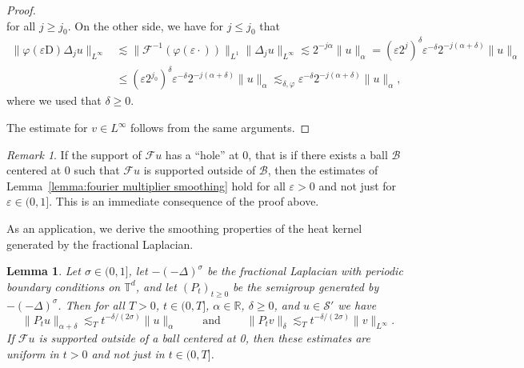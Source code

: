 \documentclass[11pt,a4paper]{article}
\newcommand{\cdummy}{\cdot}
\newcommand{\mathD}{\mathrm{D}}
\newcommand{\nosymbol}{}
\newcommand{\tmop}[1]{\ensuremath{\operatorname{#1}}}
\newtheorem{lemma}[theorem]{Lemma}
\theoremstyle{remark}
\newtheorem{remark}[theorem]{Remark}
\newcommand{\R}{\mathbb{R}}
\newcommand{\CB}{\ensuremath{\mathscr{B}}}
\newcommand{\CF}{\ensuremath{\mathscr{F}}}
\newcommand{\CS}{\ensuremath{\mathscr{S}}}
\begin{document}
\begin{proof}
\[  \]
  for all $j \geqslant j_{0}$. On the other side, we have for $j \leqslant j_{0}$ that
  \begin{align*}
     \| \varphi ( \varepsilon \mathD ) \Delta_{j} u \|_{L^{\infty}} &\lesssim \| \CF^{-1} ( \varphi ( \varepsilon \cdummy ) ) \|_{L^{1}} \| \Delta_{j} u \|_{L^{\infty}} \lesssim 2^{-j \alpha} \| u \|_{\alpha} = ( \varepsilon 2^{j} )^{\delta} \varepsilon^{- \delta} 2^{-j ( \alpha +  \delta )} \| u \|_{\alpha} \\
     & \leqslant ( \varepsilon 2^{j_{0}} )^{\delta} \varepsilon^{- \delta} 2^{-j ( \alpha + \delta )} \| u \|_{\alpha} \lesssim_{\delta , \varphi} \varepsilon^{- \delta} 2^{-j ( \alpha + \delta )} \| u \|_{\alpha},
  \end{align*}
  where we used that $\delta \geqslant 0$.
  
  The estimate for $v \in L^{\infty}$ follows from the same arguments.
\end{proof}

\begin{remark}
   If the support of $\CF u$ has a ``hole'' at 0, that is if there exists a ball $\CB$ centered at 0 such that $\CF u$ is supported outside of $\CB$, then the estimates of Lemma~\ref{lemma:fourier multiplier smoothing} hold for all $\varepsilon > 0$ and not just for $\varepsilon \in (0,1]$. This is an immediate consequence of the proof above.
\end{remark}

As an application, we derive the smoothing properties of the heat kernel generated by the fractional Laplacian.

\begin{lemma}\label{lemma:heat flow smoothing}
   Let $\sigma \in ( 0,1 ]$, let $- ( - \Delta )^{\sigma}$ be the fractional Laplacian with periodic boundary conditions on $\mathbb{T}^{d} \nosymbol$, and let $( P_{t} )_{t \geqslant 0}$ be the semigroup generated by $- ( - \Delta )^{\sigma}$. Then for all $T>0$, $t \in (0,T]$, $\alpha \in \R$, $\delta \geqslant 0$, and $u \in \CS'$ we have
  \[
     \|P_{t} u\|_{\alpha + \delta} \lesssim_T t^{- \delta / ( 2 \sigma )} \|u\|_{\alpha} \hspace{2em} \tmop{and} \hspace{2em} \| P_{t} v \|_{\delta} \lesssim_T t^{- \delta / ( 2 \sigma )} \| v \|_{L^{\infty}} .
  \]
  If $\CF u$ is supported outside of a ball centered at 0, then these estimates are uniform in $t > 0$ and not just in $t \in (0,T]$.
\end{lemma}
\end{document}
